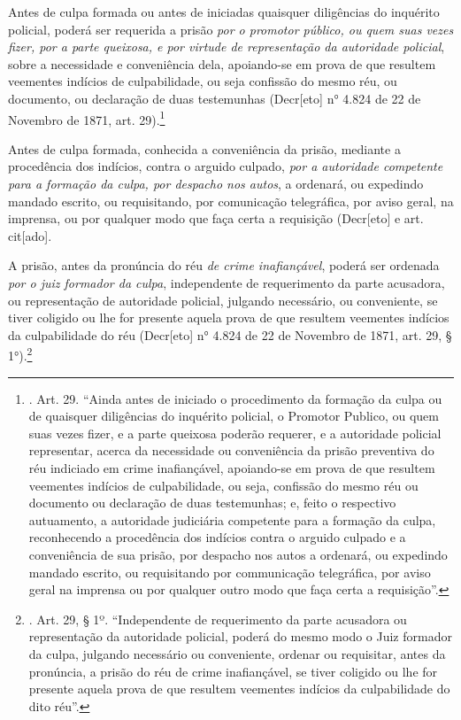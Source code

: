 Antes de culpa formada ou antes de iniciadas quaisquer diligências do
inquérito policial, poderá ser requerida a prisão \emph{por o promotor
público, ou quem suas vezes fizer, por a parte queixosa, e por virtude
de representação da autoridade policial}, sobre a necessidade e
conveniência dela, apoiando-se em prova de que resultem veementes
indícios de culpabilidade, ou seja confissão do mesmo réu, ou documento,
ou declaração de duas testemunhas (Decr{[}eto{]} n° 4.824 de 22 de
Novembro de 1871, art. 29).\footnote{. Art. 29. ``Ainda antes de
  iniciado o procedimento da formação da culpa ou de quaisquer
  diligências do inquérito policial, o Promotor Publico, ou quem suas
  vezes fizer, e a parte queixosa poderão requerer, e a autoridade
  policial representar, acerca da necessidade ou conveniência da prisão
  preventiva do réu indiciado em crime inafiançável, apoiando-se em
  prova de que resultem veementes indícios de culpabilidade, ou seja,
  confissão do mesmo réu ou documento ou declaração de duas testemunhas;
  e, feito o respectivo autuamento, a autoridade judiciária competente
  para a formação da culpa, reconhecendo a procedência dos indícios
  contra o arguido culpado e a conveniência de sua prisão, por despacho
  nos autos a ordenará, ou expedindo mandado escrito, ou requisitando
  por communicação telegráfica, por aviso geral na imprensa ou por
  qualquer outro modo que faça certa a requisição''.}

Antes de culpa formada, conhecida a conveniência da prisão, mediante a
procedência dos indícios, contra o arguido culpado, \emph{por a
autoridade competente para a formação da culpa, por despacho nos autos},
a ordenará, ou expedindo mandado escrito, ou requisitando, por
comunicação telegráfica, por aviso geral, na imprensa, ou por qualquer
modo que faça certa a requisição (Decr{[}eto{]} e art. cit{[}ado{]}.

A prisão, antes da pronúncia do réu \emph{de crime inafiançável}, poderá
ser ordenada \emph{por o juiz formador da culpa}, independente de
requerimento da parte acusadora, ou representação de autoridade
policial, julgando necessário, ou conveniente, se tiver coligido ou lhe
for presente aquela prova de que resultem veementes indícios da
culpabilidade do réu (Decr{[}eto{]} n° 4.824 de 22 de Novembro de 1871,
art. 29, § 1°).\footnote{. Art. 29, § 1º. ``Independente de requerimento
  da parte acusadora ou representação da autoridade policial, poderá do
  mesmo modo o Juiz formador da culpa, julgando necessário ou
  conveniente, ordenar ou requisitar, antes da pronúncia, a prisão do
  réu de crime inafiançável, se tiver coligido ou lhe for presente
  aquela prova de que resultem veementes indícios da culpabilidade do
  dito réu''.}

